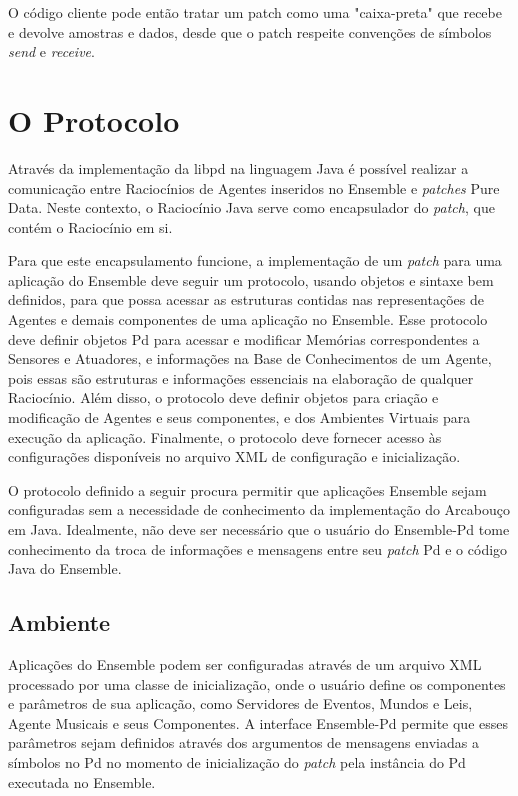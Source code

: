 \documentclass[a4paper, 11pt, twoside]{article}
\begin{document}
\begin{multicols}{2}
O código cliente pode então tratar um patch como
uma "caixa-preta" que recebe e devolve amostras
e dados, desde que o patch respeite convenções
de símbolos \textit{send} e \textit{receive}.

\section{O Protocolo}

Através da implementação da libpd na linguagem Java é possível
realizar a comunicação entre Raciocínios de Agentes inseridos no
Ensemble e \textit{patches} Pure Data. Neste contexto, o Raciocínio
Java serve como encapsulador do \textit{patch}, que contém o Raciocínio em si.

Para que este encapsulamento funcione, a implementação de um \textit{patch} 
para uma aplicação do Ensemble deve seguir um protocolo, usando objetos e
sintaxe bem definidos, para que possa acessar as estruturas contidas nas
representações de Agentes e demais componentes de uma aplicação no Ensemble.
Esse protocolo deve definir objetos Pd para acessar e modificar Memórias
correspondentes a Sensores e Atuadores, e informações na Base de Conhecimentos
de um Agente, pois essas são estruturas e informações essenciais na elaboração
de qualquer Raciocínio. Além disso, o protocolo deve definir objetos para
criação e modificação de Agentes e seus componentes, e dos Ambientes Virtuais
para execução da aplicação. Finalmente, o protocolo deve fornecer acesso às 
configurações disponíveis no arquivo XML de configuração e inicialização.

O protocolo definido a seguir procura permitir que aplicações Ensemble sejam
configuradas sem a necessidade de conhecimento da implementação do Arcabouço
em Java. Idealmente, não deve ser necessário que o usuário do Ensemble-Pd
tome conhecimento da troca de informações e mensagens entre seu \textit{patch}
Pd e o código Java do Ensemble.

\subsection{Ambiente}

Aplicações do Ensemble podem ser configuradas através de um arquivo XML
processado por uma classe de inicialização, onde o usuário define os
componentes e parâmetros de sua aplicação, como Servidores de Eventos,
Mundos e Leis, Agente Musicais e seus Componentes. A interface Ensemble-Pd
permite que esses parâmetros sejam definidos através dos argumentos de 
mensagens enviadas a símbolos no Pd no momento de inicialização do 
\textit{patch} pela instância do Pd executada no Ensemble.


\end{multicols}
\end{document}

